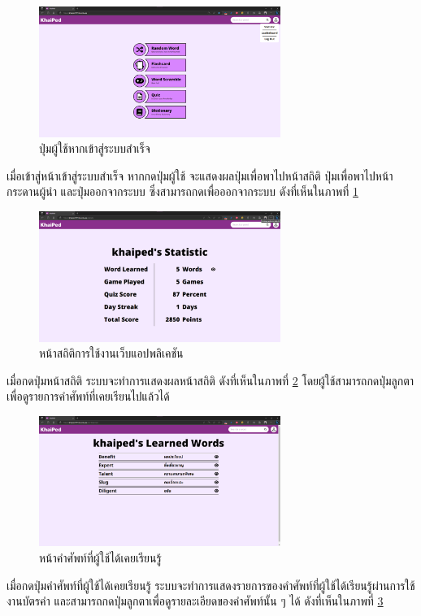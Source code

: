 \documentclass[12pt,oneside,openright,a4paper]{cpe-thai-project}
\begin{document}
\begin{figure}[!h]\centering
	\includegraphics[width=0.7\textwidth, keepaspectratio=true]{image/chap4/UI/stat/user button.png}
	\caption{{ปุ่มผู้ใช้หากเข้าสู่ระบบสำเร็จ}}\label{fig:chap4UIUserButton}
\end{figure}
\hspace{1cm}
เมื่อเข้าสู่หน้าเข้าสู่ระบบสำเร็จ หากกดปุ่มผู้ใช้ จะแสดงผลปุ่มเพื่อพาไปหน้าสถิติ ปุ่มเพื่อพาไปหน้ากระดานผู้นำ และปุ่มออกจากระบบ
ซึ่งสามารถกดเพื่อออกจากระบบ ดังที่เห็นในภาพที่ \ref{fig:chap4UIUserButton}

\pagebreak
\begin{figure}[!h]\centering
	\includegraphics[width=0.7\textwidth, keepaspectratio=true]{image/chap4/UI/stat/stat.png}
	\caption{{หน้าสถิติการใช้งานเว็บแอปพลิเคชัน}}\label{fig:chap4UIStat}
\end{figure}
\hspace{1cm}
เมื่อกดปุ่มหน้าสถิติ ระบบจะทำการแสดงผลหน้าสถิติ ดังที่เห็นในภาพที่ \ref{fig:chap4UIStat}
โดยผู้ใช้สามารถกดปุ่มลูกตา เพื่อดูรายการคำศัพท์ที่เคยเรียนไปแล้วได้

\begin{figure}[!h]\centering
	\includegraphics[width=0.7\textwidth, keepaspectratio=true]{image/chap4/UI/stat/word learned.png}
	\caption{{หน้าคำศัพท์ที่ผู้ใช้ได้เคยเรียนรู้}}\label{fig:chap4UIStatWord}
\end{figure}
\hspace{1cm}
เมื่อกดปุ่มคำศัพท์ที่ผู้ใช้ได้เคยเรียนรู้ ระบบจะทำการแสดงรายการของคำศัพท์ที่ผู้ใช้ได้เรียนรู้ผ่านการใช้งานบัตรคำ
และสามารถกดปุ่มลูกตาเพื่อดูรายละเอียดของคำศัพท์นั้น ๆ ได้ ดังที่เห็นในภาพที่ \ref{fig:chap4UIStatWord}
\end{document}
